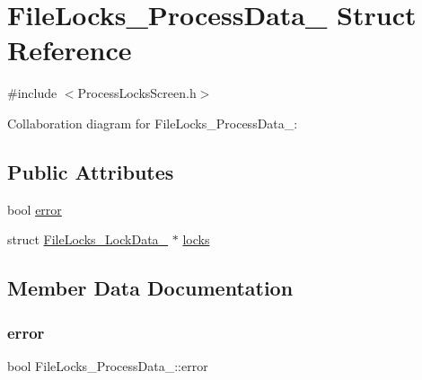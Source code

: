 \hypertarget{structFileLocks__ProcessData__}{}\section{File\+Locks\+\_\+\+Process\+Data\+\_\+ Struct Reference}
\label{structFileLocks__ProcessData__}


{\ttfamily \#include $<$Process\+Locks\+Screen.\+h$>$}



Collaboration diagram for File\+Locks\+\_\+\+Process\+Data\+\_\+\+:
\subsection*{Public Attributes}
\begin{DoxyCompactItemize}
\item 
bool \hyperlink{structFileLocks__ProcessData___aa77c2a0be2296423a350248391aec54a}{error}
\item 
struct \hyperlink{structFileLocks__LockData__}{File\+Locks\+\_\+\+Lock\+Data\+\_\+} $\ast$ \hyperlink{structFileLocks__ProcessData___a97c17bcfe10351524ebc91e2cada0afe}{locks}
\end{DoxyCompactItemize}


\subsection{Member Data Documentation}
\mbox{\label{structFileLocks__ProcessData___aa77c2a0be2296423a350248391aec54a}} 
\subsubsection{\texorpdfstring{error}{error}}
{\footnotesize\ttfamily bool File\+Locks\+\_\+\+Process\+Data\+\_\+\+::error}

\mbox{\label{structFileLocks__ProcessData___a97c17bcfe10351524ebc91e2cada0afe}} 
